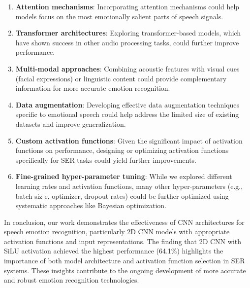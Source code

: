 \begin{enumerate}
    \item \textbf{Attention mechanisms}: Incorporating attention mechanisms could help models focus on the most emotionally salient parts of speech signals.
    
    \item \textbf{Transformer architectures}: Exploring transformer-based models, which have shown success in other audio processing tasks, could further improve performance.
    
    \item \textbf{Multi-modal approaches}: Combining acoustic features with visual cues (facial expressions) or linguistic content could provide complementary information for more accurate emotion recognition.
    
    \item \textbf{Data augmentation}: Developing effective data augmentation techniques specific to emotional speech could help address the limited size of existing datasets and improve generalization.
    
    \item \textbf{Custom activation functions}: Given the significant impact of activation functions on performance, designing or optimizing activation functions specifically for SER tasks could yield further improvements.

    \item \textbf{Fine-grained hyper-parameter tuning}: While we explored different learning rates and activation functions, many other hyper-parameters (e.g., batch siz e, optimizer, dropout rates) could be further optimized using systematic approaches like Bayesian optimization.
\end{enumerate}

In conclusion, our work demonstrates the effectiveness of CNN architectures for speech emotion recognition, particularly 2D CNN models with appropriate activation functions and input representations. The finding that 2D CNN with SiLU activation achieved the highest performance (64.1\%) highlights the importance of both model architecture and activation function selection in SER systems. These insights contribute to the ongoing development of more accurate and robust emotion recognition technologies.         